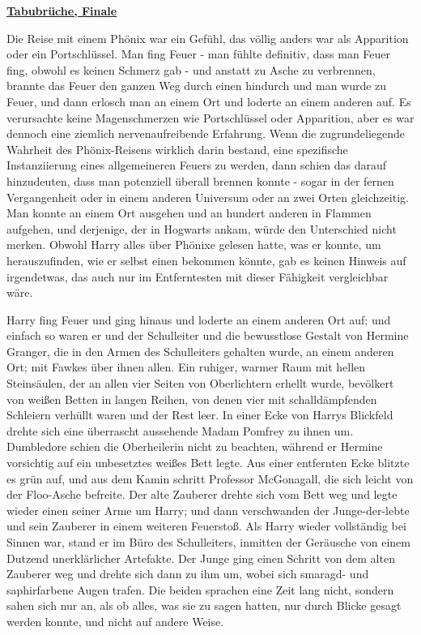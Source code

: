 

\hypertarget{tabubruxfcche-finale}{%

\textbf{\uline{Tabubrüche, Finale}}

Die Reise mit einem Phönix war ein Gefühl, das völlig anders war als Apparition oder ein Portschlüssel. Man fing Feuer - man fühlte definitiv, dass man Feuer fing, obwohl es keinen Schmerz gab - und anstatt zu Asche zu verbrennen, brannte das Feuer den ganzen Weg durch einen hindurch und man wurde zu Feuer, und dann erlosch man an einem Ort und loderte an einem anderen auf. Es verursachte keine Magenschmerzen wie Portschlüssel oder Apparition, aber es war dennoch eine ziemlich nervenaufreibende Erfahrung. Wenn die zugrundeliegende Wahrheit des Phönix-Reisens wirklich darin bestand, eine spezifische Instanziierung eines allgemeineren Feuers zu werden, dann schien das darauf hinzudeuten, dass man potenziell überall brennen konnte - sogar in der fernen Vergangenheit oder in einem anderen Universum oder an zwei Orten gleichzeitig. Man konnte an einem Ort ausgehen und an hundert anderen in Flammen aufgehen, und derjenige, der in Hogwarts ankam, würde den Unterschied nicht merken. Obwohl Harry alles über Phönixe gelesen hatte, was er konnte, um herauszufinden, wie er selbst einen bekommen könnte, gab es keinen Hinweis auf irgendetwas, das auch nur im Entferntesten mit dieser Fähigkeit vergleichbar wäre.

Harry fing Feuer und ging hinaus und loderte an einem anderen Ort auf; und einfach so waren er und der Schulleiter und die bewusstlose Gestalt von Hermine Granger, die in den Armen des Schulleiters gehalten wurde, an einem anderen Ort; mit Fawkes über ihnen allen. Ein ruhiger, warmer Raum mit hellen Steinsäulen, der an allen vier Seiten von Oberlichtern erhellt wurde, bevölkert von weißen Betten in langen Reihen, von denen vier mit schalldämpfenden Schleiern verhüllt waren und der Rest leer. In einer Ecke von Harrys Blickfeld drehte sich eine überrascht aussehende Madam Pomfrey zu ihnen um. Dumbledore schien die Oberheilerin nicht zu beachten, während er Hermine vorsichtig auf ein unbesetztes weißes Bett legte. Aus einer entfernten Ecke blitzte es grün auf, und aus dem Kamin schritt Professor McGonagall, die sich leicht von der Floo-Asche befreite. Der alte Zauberer drehte sich vom Bett weg und legte wieder einen seiner Arme um Harry; und dann verschwanden der Junge-der-lebte und sein Zauberer in einem weiteren Feuerstoß. Als Harry wieder vollständig bei Sinnen war, stand er im Büro des Schulleiters, inmitten der Geräusche von einem Dutzend unerklärlicher Artefakte. Der Junge ging einen Schritt von dem alten Zauberer weg und drehte sich dann zu ihm um, wobei sich smaragd- und saphirfarbene Augen trafen. Die beiden sprachen eine Zeit lang nicht, sondern sahen sich nur an, als ob alles, was sie zu sagen hatten, nur durch Blicke gesagt werden konnte, und nicht auf andere Weise.

}
